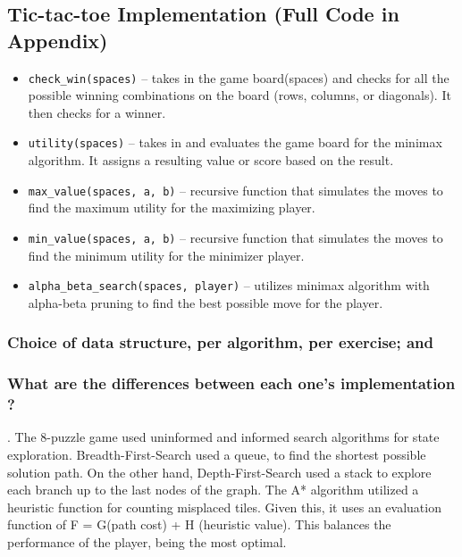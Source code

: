 \documentclass[journal]{./IEEE/IEEEtran}
\begin{document}
\subsection{Tic-tac-toe Implementation (Full Code in Appendix)}
\begin{itemize}
  \item \texttt{check\_win(spaces)} – takes in the game board(spaces) and checks for all the possible winning combinations on the board (rows, columns, or diagonals). It then checks for a winner.

  \item \texttt{utility(spaces)} – takes in and evaluates the game board for the minimax algorithm. It assigns a resulting value or score based on the result.

  \item \texttt{max\_value(spaces, a, b)} –  recursive function that simulates the moves to find the maximum utility for the maximizing player.

  \item \texttt{min\_value(spaces, a, b)} – recursive function that simulates the moves to find the minimum utility for the minimizer player.

  \item \texttt{alpha\_beta\_search(spaces, player)} – utilizes minimax algorithm with alpha-beta pruning to find the best possible move for the player.
\end{itemize}


\subsubsection{Choice of data structure, per algorithm, per exercise; and}
\subsubsection{What are the differences between each one’s implementation ?}.\newline
The 8-puzzle game used uninformed and informed search algorithms for state exploration. 
Breadth-First-Search used a queue, to find the shortest possible solution path. On the other hand, 
Depth-First-Search used a stack to explore each branch up to the last nodes of the graph. The A* algorithm 
utilized a heuristic function for counting misplaced tiles. Given this, it uses an evaluation function 
of F = G(path cost) + H (heuristic value). This balances the performance of the player, being the most optimal.
\end{document}
